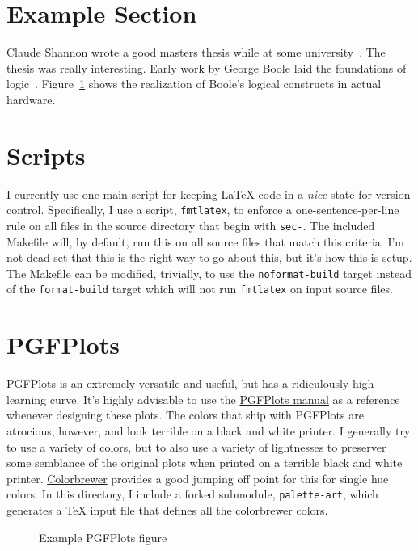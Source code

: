 \maketitle

\begin{abstract}
  Basic document that demonstrates the {\LaTeX} build flow that I use as well as several quirks regarding specific packages.
\end{abstract}

\section{Example Section}
Claude Shannon wrote a good masters thesis while at some university~\cite{shannon1938}.
The thesis was really interesting.
Early work by George Boole laid the foundations of logic~\missingcitation.
Figure~\ref{fig-shannon} shows the realization of Boole's logical constructs in actual hardware.

\begin{figure}[h]
  \caption{}
  \label{fig-shannon}
\end{figure}

\section{Scripts}
I currently use one main script for keeping {\LaTeX} code in a \emph{nice} state for version control.
Specifically, I use a script, \texttt{fmtlatex}, to enforce a one-sentence-per-line rule on all files in the source directory that begin with \texttt{sec-}.
The included Makefile will, by default, run this on all source files that match this criteria.
I'm not dead-set that this is the right way to go about this, but it's how this is setup.
The Makefile can be modified, trivially, to use the \texttt{noformat-build} target instead of the \texttt{format-build} target which will not run \texttt{fmtlatex} on input source files.

\section{PGFPlots}
PGFPlots is an extremely versatile and useful, but has a ridiculously high learning curve.
It's highly advisable to use the \href{http://mirrors.ctan.org/graphics/pgf/contrib/pgfplots/doc/pgfplots.pdf}{PGFPlots manual} as a reference whenever designing these plots.
The colors that ship with PGFPlots are atrocious, however, and look terrible on a black and white printer.
I generally try to use a variety of colors, but to also use a variety of lightnesses to preserver some semblance of the original plots when printed on a terrible black and white printer.
\href{http://colorbrewer2.org/}{Colorbrewer} provides a good jumping off point for this for single hue colors.
In this directory, I include a forked submodule, \texttt{palette-art}, which generates a {\TeX} input file that defines all the colorbrewer colors.

\begin{figure}[h]
  \caption{Example PGFPlots figure}
\end{figure}
